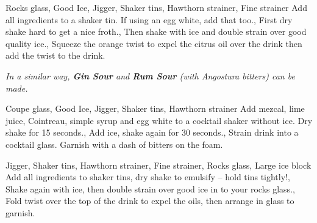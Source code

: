 \documentclass[../main.tex]{subfiles}
\begin{document}
\clearpage
{}

{Rocks glass, Good Ice, Jigger, Shaker tins, Hawthorn strainer, Fine strainer}
{
    {Add all ingredients to a shaker tin. If using an egg white, add that too.},
    {First dry shake hard to get a nice froth.},
    {Then shake with ice and double strain over good quality ice.},
    {Squeeze the orange twist to expel the citrus oil over the drink then add the twist to the drink.}
}

\medskip
\begin{center}
    \textit{In a similar way, \textbf{Gin Sour} and \textbf{Rum Sour} (with Angostura bitters) can be made.}
\end{center}

\cocktailDivider

{Coupe glass, Good Ice, Jigger, Shaker tins, Hawthorn strainer}
{
    {Add mezcal, lime juice, Cointreau, simple syrup and egg white to a cocktail shaker without ice. Dry shake for 15 seconds.},
    {Add ice, shake again for 30 seconds.},
    {Strain drink into a cocktail glass. Garnish with a dash of bitters on the foam.}
}

\cocktailDivider

%
{Jigger, Shaker tins, Hawthorn strainer, Fine strainer, Rocks glass, Large ice block}
%
{
	{Add all ingredients to shaker tins, dry shake to emulsify -- hold tins tightly!},
	{Shake again with ice, then double strain over good ice in to your rocks glass}.,
	{Fold twist over the top of the drink to expel the oils, then arrange in glass to garnish.}
}
\end{document}
